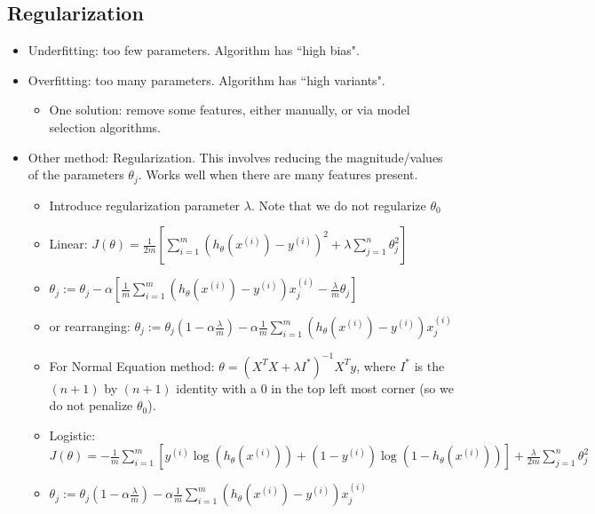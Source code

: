 \documentclass[letterpaper,10pt]{article}
\begin{document}
\subsection{Regularization}
\begin{itemize}
\item Underfitting: too few parameters. Algorithm has ``high bias".
\item Overfitting: too many parameters. Algorithm has ``high variants".
	\begin{itemize}
	\item One solution: remove some features, either manually, or via model selection algorithms.
	\end{itemize}
\item Other method: Regularization. This involves reducing the magnitude/values of the parameters $\theta_j$. Works well when there are many features present.
	\begin{itemize}
	\item Introduce regularization parameter $\lambda$. Note that we do not regularize $\theta_0$
	\item Linear: $J(\theta) = \frac{1}{2m} \left[ \sum_{i=1}^m \left( h_{\theta} (x^{(i)}) - y^{(i)} \right)^2 + \lambda \sum_{j=1}^n \theta_j^2 \right]$
	\item $\theta_j := \theta_j - \alpha \left[ \frac{1}{m} \sum_{i=1}^m \left( h_{\theta}(x^{(i)}) - y^{(i)}  \right) x_j^{(i)} - \frac{\lambda}{m}\theta_j \right] $
	\item or rearranging: $\theta_j := \theta_j \left(1-\alpha \frac{\lambda}{m} \right) - \alpha \frac{1}{m} \sum_{i=1}^m \left( h_{\theta}(x^{(i)}) - y^{(i)}  \right) x_j^{(i)} $
	\item For Normal Equation method: $\theta = (X^T X + \lambda I^*)^{-1} X^T y$, where $I^*$ is the $(n+1)$ by $(n+1)$ identity with a 0 in the top left most corner (so we do not penalize $\theta_0$).
	\item Logistic: $J(\theta) = -  \frac{1}{m} \sum_{i=1}^m \left[ y^{(i)}\log\left(h_{\theta}(x^{(i)}) \right) + (1-y^{(i)})\log\left(1 - h_{\theta}(x^{(i)}) \right) \right] + \frac{\lambda}{2m}\sum_{j=1}^n \theta_j^2$
	\item $\theta_j := \theta_j (1 - \alpha \frac{\lambda}{m}) - \alpha \frac{1}{m} \sum_{i=1}^m \left( h_{\theta}(x^{(i)}) - y^{(i)}  \right) x_j^{(i)}$
	\end{itemize}

\end{itemize}	
\end{document}
